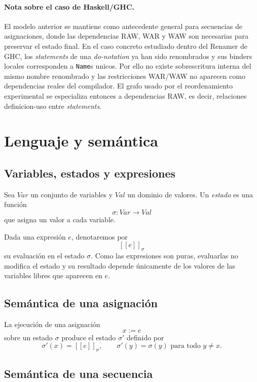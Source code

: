 \documentclass[letterpaper,oneside]{article}
\theoremstyle{remark}
\newcommand{\Val}{\mathit{Val}}
\newcommand{\Var}{\mathit{Var}}
\newcommand{\sem}[1]{\left[\!\left[ #1 \right]\!\right]}
\begin{document}
\paragraph{Nota sobre el caso de \textsf{Haskell}/\textsf{GHC}.}
El modelo anterior se mantiene como antecedente general para secuencias de asignaciones, donde las dependencias RAW, WAR y WAW son necesarias para preservar el estado final. En el caso concreto estudiado dentro del Renamer de \textsf{GHC}, los \textit{statements} de una \textit{do-notation} ya han sido renombrados y sus binders locales corresponden a \texttt{Name}s unicos. Por ello no existe sobrescritura interna del mismo nombre renombrado y las restricciones WAR/WAW no aparecen como dependencias reales del compilador. El grafo usado por el reordenamiento experimental se especializa entonces a dependencias RAW, es decir, relaciones definicion-uso entre \textit{statements}.

\section{Lenguaje y semántica}

\subsection{Variables, estados y expresiones}

Sea $\Var$ un conjunto de variables y $\Val$ un dominio de valores. Un \emph{estado} es una función
\[
  \sigma : \Var \to \Val
\]
que asigna un valor a cada variable.

Dada una expresión $e$, denotaremos por
\[
  \sem{e}_\sigma
\]
su evaluación en el estado $\sigma$. Como las expresiones son puras, evaluarlas no modifica el estado y su resultado depende únicamente de los valores de las variables libres que aparecen en $e$.

\subsection{Semántica de una asignación}

La ejecución de una asignación
\[
  x := e
\]
sobre un estado $\sigma$ produce el estado $\sigma'$ definido por
\[
  \sigma'(x) = \sem{e}_\sigma,
  \qquad
  \sigma'(y) = \sigma(y) \text{ para todo } y \neq x.
\]

\subsection{Semántica de una secuencia}
\end{document}
